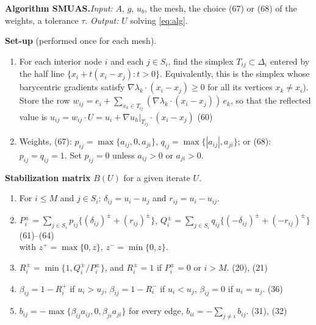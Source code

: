 \documentclass[11pt]{article}
\begin{document}
\begin{framed}
\noindent\textbf{Algorithm SMUAS.}\quad\emph{Input:} $A$, $g$, $u_b$, the mesh, the choice (67) or (68) of the weights,
a tolerance $\tau$. \emph{Output:} $U$ solving \eqref{eq:alg}.

\smallskip\noindent\textbf{Set-up} (performed once for each mesh).
\begin{enumerate}[label=S\arabic*., leftmargin=*, itemsep=2pt]
\item For each interior node $i$ and each $j\in S_i$, find the simplex $T_{ij}\subset\Delta_i$ entered by the half
  line $\{x_i+t(x_i-x_j):t>0\}$. Equivalently, this is the simplex whose barycentric gradients satisfy
  $\nabla\lambda_k\cdot(x_i-x_j)\ge0$ for all its vertices $x_k\ne x_i$). Store the row
  $w_{ij}=e_i+\sum_{x_k\in T_{ij}}(\nabla\lambda_k\cdot(x_i-x_j))\,e_k$, so that the reflected value is
  $u_{ij}=w_{ij}\cdot U=u_i+\nabla u_h|_{T_{ij}}\cdot(x_i-x_j)$ \hfill(60)
\item Weights, (67): $p_{ij}=\max\{a_{ij},0,a_{ji}\}$, $q_{ij}=\max\{|a_{ij}|,a_{ji}\}$; or (68): $p_{ij}=q_{ij}=1$.
  Set $p_{ij}=0$ unless $a_{ij}>0$ or $a_{ji}>0$.
\end{enumerate}

\noindent\textbf{Stabilization matrix} $B(U)$ for a given iterate $U$.
\begin{enumerate}[label=B\arabic*., leftmargin=*, itemsep=2pt]
\item For $i\le M$ and $j\in S_i$: $\delta_{ij}=u_i-u_j$ and $r_{ij}=u_i-u_{ij}$.
\item $P_i^\pm=\sum_{j\in S_i}p_{ij}\{(\delta_{ij})^\pm+(r_{ij})^\pm\}$,\quad
  $Q_i^\pm=\sum_{j\in S_i}q_{ij}\{(-\delta_{ij})^\pm+(-r_{ij})^\pm\}$ \hfill(61)--(64)\\
  with $z^+=\max\{0,z\}$, $z^-=\min\{0,z\}$.
\item $R_i^\pm=\min\{1,Q_i^\pm/P_i^\pm\}$, and $R_i^\pm=1$ if $P_i^\pm=0$ or $i>M$. \hfill(20), (21)
\item $\beta_{ij}=1-R_i^+$ if $u_i>u_j$, $\beta_{ij}=1-R_i^-$ if $u_i<u_j$, $\beta_{ij}=0$ if $u_i=u_j$. \hfill(36)
\item $b_{ij}=-\max\{\beta_{ij}a_{ij},0,\beta_{ji}a_{ji}\}$ for every edge, $b_{ii}=-\sum_{j\neq i}b_{ij}$. \hfill(31), (32)
\end{enumerate}


\end{framed}
\end{document}

